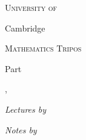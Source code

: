 \begin{titlepage}
  \begin{center}
    \vspace{2cm}
    {\scshape\huge University of \par
      \Huge Cambridge \par}
    \vspace{1cm}
    {\scshape\huge Mathematics Tripos \par}
    \vspace{2cm}
    {\huge Part \npart \par}
    \vspace{0.6cm}
    {\Huge \bfseries \ntitle \par}
    \vspace{1.2cm}
    {\Large\nterm, \nyear \par}
    \vspace{2cm}
    
    {\large \emph{Lectures by } \par}
    \vspace{0.2cm}
    {\Large \scshape \nlecturer}
    
    \vspace{0.5cm}
    {\large \emph{Notes by }\par}
    \vspace{0.2cm}
    {\Large \scshape \href{mailto:\nauthoremail}{\nauthor}}
 \end{center}
\end{titlepage}